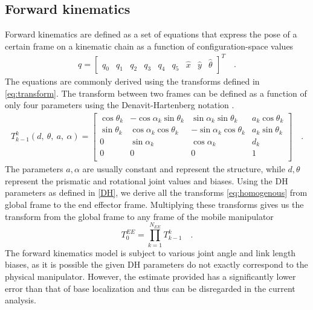 \documentclass[times, utf8, diplomski, english]{fer}
\begin{document}
\subsection{Forward kinematics}\label{subsection:FK}
Forward kinematics are defined as a set of equations that express the pose of a certain frame on a kinematic chain as a function of configuration-space values
\begin{align}\label{eq:config_matrix}
q = 
\begin{bmatrix}
q_0& q_1& q_2& q_3& q_4& q_5& \hat{x}& \hat{y}& \hat{\theta}
\end{bmatrix}^T \quad .
\end{align}
The equations are commonly derived using the transforms defined in \eqref{eq:transform}.
The transform between two frames can be defined as a function of only four parameters using the Denavit-Hartenberg notation \citep{uicker1964iterative}.
\begin{align}
T_{k-1}^k(d, \ \theta, \ a, \ \alpha)
=
\begin{bmatrix}
\cos\theta_{k}& -\cos\alpha_{k}\sin\theta_{k} & \sin\alpha_{k}\sin\theta_{k} & a_k\cos\theta_{k}\\
\sin\theta_{k}& \cos\alpha_{k}\cos\theta_{k} & -\sin\alpha_{k}\cos\theta_{k} & a_k\sin\theta_{k}\\
0 & \sin\alpha_{k} & \cos\alpha_{k} & d_{k}\\
0 & 0 & 0 & 1\\
\end{bmatrix} \quad .
\label{eq:homogenous}
\end{align}
The parameters $a, \alpha$ are usually constant and represent the structure, while $d, \theta$ represent the prismatic and rotational joint values and biases.
Using the DH parameters as defined in \autoref{DH}, we derive all the transforms \eqref{eq:homogenous} from global frame to the end effector frame.
Multiplying these transforms gives us the transform from the global frame to any frame of the mobile manipulator
\begin{equation}
T_{0}^{EE} = \prod_{k=1}^{N_{EE}} T_{k-1}^{k} \quad .
\label{FK}
\end{equation}
The forward kinematics model is subject to various joint angle and link length biases, as it is possible the given DH parameters do not exactly correspond to the physical manipulator.
However, the estimate provided has a significantly lower error than that of base localization and thus can be disregarded in the current analysis.
\end{document}
